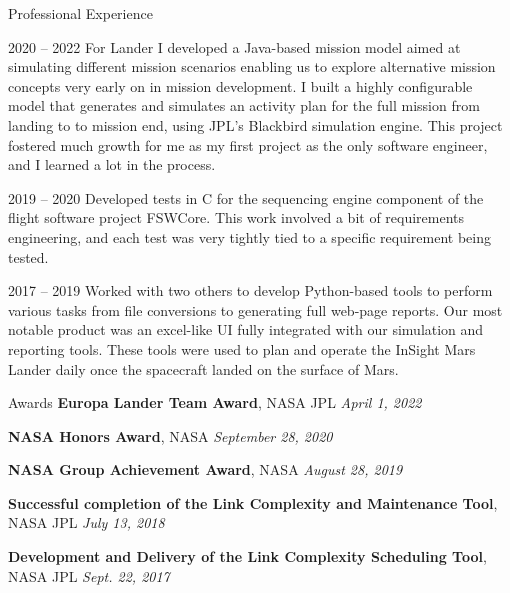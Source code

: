 \documentclass{resume} %
\begin{document}
\begin{rSection}{Professional Experience}{}
{        
        {}
        {2020 -- 2022}
        {
           For Lander I developed a Java-based mission model aimed at simulating different mission scenarios enabling us to explore alternative mission concepts very early on in mission development. I built a highly configurable model that generates and simulates an activity plan for the full mission from landing to to mission end, using JPL's Blackbird simulation engine. This project fostered much growth for me as my first project as the only software engineer, and I learned a lot in the process.
        }

        {}
        {2019 -- 2020}
        {
          Developed tests in C for the sequencing engine component of the flight software project FSWCore. This work involved a bit of requirements engineering, and each test was very tightly tied to a specific requirement being tested.
        }

        {}
        {2017 -- 2019}
        {
          Worked with two others to develop Python-based tools to perform various tasks from file conversions to generating full web-page reports. Our most notable product was an excel-like UI fully integrated with our simulation and reporting tools. These tools were used to plan and operate the InSight Mars Lander daily once the spacecraft landed on the surface of Mars.
        }

    }
\end{rSection}

\begin{rSection}{Awards}{}
  \textbf{Europa Lander Team Award}, NASA JPL
  \hfill
  \emph{April 1, 2022}

  \textbf{NASA Honors Award}, NASA
  \hfill
  \emph{September 28, 2020}

  \textbf{NASA Group Achievement Award}, NASA
  \hfill
  \emph{August 28, 2019}

  \textbf{Successful completion of the Link Complexity and Maintenance Tool}, NASA JPL
  \hfill
  \emph{July 13, 2018}

  \textbf{Development and Delivery of the Link Complexity Scheduling Tool}, NASA JPL
  \hfill
  \emph{Sept. 22, 2017}

\end{rSection}
\end{document}
